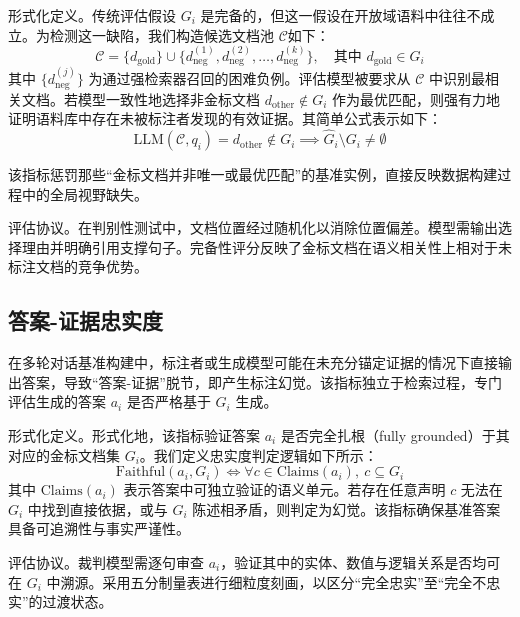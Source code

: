 形式化定义。传统评估假设 $G_i$ 是完备的，但这一假设在开放域语料中往往不成立。为检测这一缺陷，我们构造候选文档池 $\mathcal{C}$如下：
\begin{equation}
    \mathcal{C} = \{d_{\text{gold}}\} \cup \{d_{\text{neg}}^{(1)}, d_{\text{neg}}^{(2)}, \dots, d_{\text{neg}}^{(k)}\}, \quad \text{其中 } d_{\text{gold}} \in G_i
\end{equation}
其中 $\{d_{\text{neg}}^{(j)}\}$ 为通过强检索器召回的困难负例。评估模型被要求从 $\mathcal{C}$ 中识别最相关文档。若模型一致性地选择非金标文档 $d_{\text{other}} \notin G_i$ 作为最优匹配，则强有力地证明语料库中存在未被标注者发现的有效证据。其简单公式表示如下：
\begin{equation}
    \text{LLM}(\mathcal{C}, q_i) = d_{\text{other}} \notin G_i \implies \hat{G}_i \setminus G_i \neq \emptyset
\end{equation}

该指标惩罚那些“金标文档并非唯一或最优匹配”的基准实例，直接反映数据构建过程中的全局视野缺失。



评估协议。在判别性测试中，文档位置经过随机化以消除位置偏差。模型需输出选择理由并明确引用支撑句子。完备性评分反映了金标文档在语义相关性上相对于未标注文档的竞争优势。



\subsection{答案-证据忠实度}



在多轮对话基准构建中，标注者或生成模型可能在未充分锚定证据的情况下直接输出答案，导致“答案-证据”脱节，即产生标注幻觉。该指标独立于检索过程，专门评估生成的答案 $a_i$ 是否严格基于 $G_i$ 生成。



形式化定义。形式化地，该指标验证答案 $a_i$ 是否完全扎根（fully grounded）于其对应的金标文档集 $G_i$。我们定义忠实度判定逻辑如下所示：
\begin{equation}
    \text{Faithful}(a_i, G_i) \iff \forall c \in \text{Claims}(a_i), \ c \subseteq G_i
\end{equation}
其中 $\text{Claims}(a_i)$ 表示答案中可独立验证的语义单元。若存在任意声明 $c$ 无法在 $G_i$ 中找到直接依据，或与 $G_i$ 陈述相矛盾，则判定为幻觉。该指标确保基准答案具备可追溯性与事实严谨性。



评估协议。裁判模型需逐句审查 $a_i$，验证其中的实体、数值与逻辑关系是否均可在 $G_i$ 中溯源。采用五分制量表进行细粒度刻画，以区分“完全忠实”至“完全不忠实”的过渡状态。



